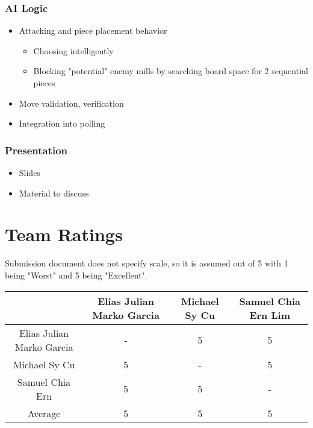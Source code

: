 \documentclass[11pt]{article}
\begin{document}
\subsubsection{AI Logic}
\label{sec:orgbf63e6f}
\begin{itemize}
\item Attacking and piece placement behavior
\begin{itemize}
\item Choosing intelligently
\item Blocking "potential" enemy mills by searching board space for 2 sequential pieces
\end{itemize}
\item Move validation, verification
\item Integration into polling
\end{itemize}
\subsubsection{Presentation}
\label{sec:orgf1927e6}
\begin{itemize}
\item Slides
\item Material to discuss
\end{itemize}
\section{Team Ratings}
\label{sec:orgc16ab59}
Submission document does not specify scale, so it is assumed out of 5 with 1 being "Worst" and 5
being "Excellent".

\begin{center}
\begin{tabular}{|c|c|c|c|}
\hline
 & Elias Julian Marko Garcia & Michael Sy Cu & Samuel Chia Ern Lim\\
\hline
Elias Julian Marko Garcia & - & 5 & 5\\
\hline
Michael Sy Cu & 5 & - & 5\\
\hline
Samuel Chia Ern & 5 & 5 & -\\
\hline
Average & 5 & 5 & 5\\
\hline
\end{tabular}
\end{center}
\end{document}
